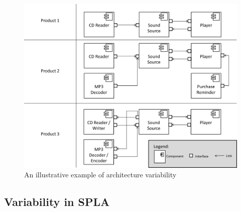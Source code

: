 \documentclass[graybox]{svmult}
\begin{document}
\begin{figure}[t!]
\centering
\includegraphics[width=\textwidth]{figs/kind_architecture_variability.png}
\caption{An illustrative example of architecture variability}
\label{fig:archVarExam1}
\end{figure}

\subsection{Variability in SPLA}

\end{document}
